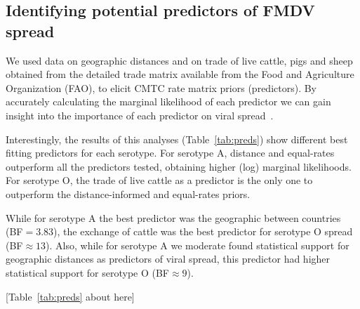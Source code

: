 \documentclass[10pt]{article}
\begin{document}
\subsection*{Identifying potential predictors of FMDV spread}

We used data on geographic distances and on trade of live cattle, pigs and sheep obtained from the detailed trade matrix available from the Food and Agriculture Organization (FAO), to elicit CMTC rate matrix priors (predictors).
By accurately calculating the marginal likelihood of each predictor we can gain insight into the importance of each predictor on viral spread~\cite{Carvalho2013,Nelson2011}.

Interestingly, the results of this analyses (Table~\ref{tab:preds}) show different best fitting predictors for each serotype.
For serotype A, distance and equal-rates outperform all the predictors tested, obtaining higher (log) marginal likelihoods.
For serotype O, the trade of live cattle as a predictor is the only one to outperform the distance-informed and equal-rates  priors.

While for serotype A the best predictor was the geographic between countries (BF$=3.83$), the exchange of cattle was the best predictor for serotype O spread (BF$\approx 13$).
Also, while for serotype A we moderate found statistical support for geographic distances as predictors of viral spread, this predictor had higher statistical support for serotype O (BF$\approx 9$).

\begin{center}
 [Table~\ref{tab:preds} about here]
\end{center}
\end{document}
